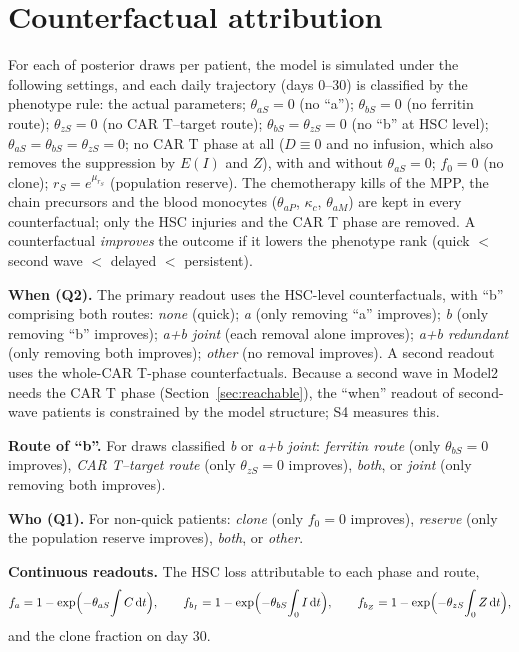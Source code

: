 \documentclass[11pt]{article}
\newcommand{\dd}{\mathrm{d}}
\begin{document}
\section{Counterfactual attribution}
For each of \valAttrib{} posterior draws per patient, the model is simulated under the following settings, and each daily trajectory (days 0--30) is classified by the phenotype rule: the actual parameters; $\theta_{aS}=0$ (no ``a''); $\theta_{bS}=0$ (no ferritin route); $\theta_{zS}=0$ (no CAR T--target route); $\theta_{bS}=\theta_{zS}=0$ (no ``b'' at HSC level); $\theta_{aS}=\theta_{bS}=\theta_{zS}=0$; no CAR T phase at all ($D\equiv0$ and no infusion, which also removes the suppression by $E(I)$ and $Z$), with and without $\theta_{aS}=0$; $f_0=0$ (no clone); $r_S=e^{\mu_{r_S}}$ (population reserve). The chemotherapy kills of the MPP, the chain precursors and the blood monocytes ($\theta_{aP}$, $\kappa_c$, $\theta_{aM}$) are kept in every counterfactual; only the HSC injuries and the CAR T phase are removed. A counterfactual \emph{improves} the outcome if it lowers the phenotype rank (quick $<$ second wave $<$ delayed $<$ persistent).

\textbf{When (Q2).} The primary readout uses the HSC-level counterfactuals, with ``b'' comprising both routes: \emph{none} (quick); \emph{a} (only removing ``a'' improves); \emph{b} (only removing ``b'' improves); \emph{a+b joint} (each removal alone improves); \emph{a+b redundant} (only removing both improves); \emph{other} (no removal improves). A second readout uses the whole-CAR T-phase counterfactuals. Because a second wave in Model2 needs the CAR T phase (Section~\ref{sec:reachable}), the ``when'' readout of second-wave patients is constrained by the model structure; S4 measures this.

\textbf{Route of ``b''.} For draws classified \emph{b} or \emph{a+b joint}: \emph{ferritin route} (only $\theta_{bS}=0$ improves), \emph{CAR T--target route} (only $\theta_{zS}=0$ improves), \emph{both}, or \emph{joint} (only removing both improves).

\textbf{Who (Q1).} For non-quick patients: \emph{clone} (only $f_0=0$ improves), \emph{reserve} (only the population reserve improves), \emph{both}, or \emph{other}.

\textbf{Continuous readouts.} The HSC loss attributable to each phase and route,
\begin{equation}
f_a = 1-\exp\Bigl(-\theta_{aS}\!\int C\,\dd t\Bigr),\qquad f_{b_I} = 1-\exp\Bigl(-\theta_{bS}\!\int_0 I\,\dd t\Bigr),\qquad f_{b_Z} = 1-\exp\Bigl(-\theta_{zS}\!\int_0 Z\,\dd t\Bigr),
\end{equation}
and the clone fraction on day 30.
\end{document}

